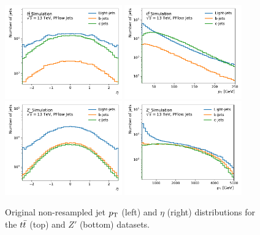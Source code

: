\begin{figure}
    \centering
    \includegraphics[width=0.45\textwidth]{figures/flavour_tagging/ttbar_0.pdf}
    \includegraphics[width=0.45\textwidth]{figures/flavour_tagging/ttbar_1.pdf}
    \includegraphics[width=0.45\textwidth]{figures/flavour_tagging/zprime_0.pdf}
    \includegraphics[width=0.45\textwidth]{figures/flavour_tagging/zprime_1.pdf}
    \caption{Original non-resampled jet $p_{\text{T}}$ (left) and $\eta$ (right) distributions for the $t\bar{t}$ (top) and $Z'$ (bottom) datasets.}
    \label{fig:jet_pt_eta}
\end{figure}

